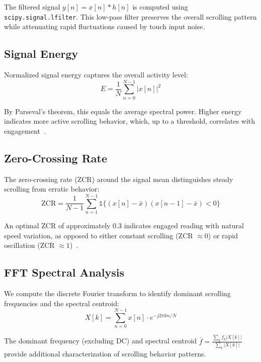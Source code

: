 \documentclass[conference]{IEEEtran}
\begin{document}
The filtered signal $y[n] = x[n] * h[n]$ is computed using \texttt{scipy.signal.lfilter}. This low-pass filter preserves the overall scrolling pattern while attenuating rapid fluctuations caused by touch input noise.

\subsection{Signal Energy}

Normalized signal energy captures the overall activity level:
\begin{equation}
E = \frac{1}{N} \sum_{n=0}^{N-1} |x[n]|^2
\label{eq:energy}
\end{equation}

By Parseval's theorem, this equals the average spectral power. Higher energy indicates more active scrolling behavior, which, up to a threshold, correlates with engagement~\cite{baker2010}.

\subsection{Zero-Crossing Rate}

The zero-crossing rate (ZCR) around the signal mean distinguishes steady scrolling from erratic behavior:
\begin{equation}
\text{ZCR} = \frac{1}{N-1} \sum_{n=1}^{N-1} \mathbb{1}\{(x[n] - \bar{x})(x[n-1] - \bar{x}) < 0\}
\label{eq:zcr}
\end{equation}

An optimal ZCR of approximately 0.3 indicates engaged reading with natural speed variation, as opposed to either constant scrolling (ZCR $\approx 0$) or rapid oscillation (ZCR $\approx 1$)~\cite{woolf2009}.

\subsection{FFT Spectral Analysis}

We compute the discrete Fourier transform to identify dominant scrolling frequencies and the spectral centroid:
\begin{equation}
X[k] = \sum_{n=0}^{N-1} x[n] \cdot e^{-j2\pi kn/N}
\label{eq:fft}
\end{equation}

The dominant frequency (excluding DC) and spectral centroid $\bar{f} = \frac{\sum_k f_k |X[k]|}{\sum_k |X[k]|}$ provide additional characterization of scrolling behavior patterns.
\end{document}

